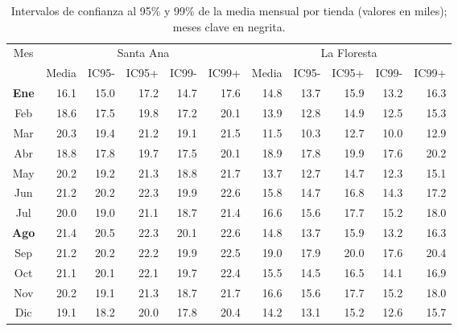 \documentclass[12pt,a4paper]{article}
\begin{document}
\begin{table}[H]
  \centering
  \small
  \begin{tabular}{c rrrrr | rrrrr}
    \toprule
    Mes & \multicolumn{5}{c}{Santa Ana} & \multicolumn{5}{c}{La Floresta}\\
         & Media & IC95- & IC95+ & IC99- & IC99+ & Media & IC95- & IC95+ & IC99- & IC99+\\
    \midrule
    \textbf{Ene} & 16.1 & 15.0 & 17.2 & 14.7 & 17.6 & 14.8 & 13.7 & 15.9 & 13.2 & 16.3\\
    Feb & 18.6 & 17.5 & 19.8 & 17.2 & 20.1 & 13.9 & 12.8 & 14.9 & 12.5 & 15.3\\
    Mar & 20.3 & 19.4 & 21.2 & 19.1 & 21.5 & 11.5 & 10.3 & 12.7 & 10.0 & 12.9\\
    Abr & 18.8 & 17.8 & 19.7 & 17.5 & 20.1 & 18.9 & 17.8 & 19.9 & 17.6 & 20.2\\
    May & 20.2 & 19.2 & 21.3 & 18.8 & 21.7 & 13.7 & 12.7 & 14.7 & 12.3 & 15.1\\
    Jun & 21.2 & 20.2 & 22.3 & 19.9 & 22.6 & 15.8 & 14.7 & 16.8 & 14.3 & 17.2\\
    Jul & 20.0 & 19.0 & 21.1 & 18.7 & 21.4 & 16.6 & 15.6 & 17.7 & 15.2 & 18.0\\
    \textbf{Ago} & 21.4 & 20.5 & 22.3 & 20.1 & 22.6 & 14.8 & 13.7 & 15.9 & 13.2 & 16.3\\
    Sep & 21.2 & 20.2 & 22.2 & 19.9 & 22.5 & 19.0 & 17.9 & 20.0 & 17.6 & 20.4\\
    Oct & 21.1 & 20.1 & 22.1 & 19.7 & 22.4 & 15.5 & 14.5 & 16.5 & 14.1 & 16.9\\
    Nov & 20.2 & 19.1 & 21.3 & 18.7 & 21.7 & 16.6 & 15.6 & 17.7 & 15.2 & 18.0\\
    Dic & 19.1 & 18.2 & 20.0 & 17.8 & 20.4 & 14.2 & 13.1 & 15.2 & 12.6 & 15.7\\
    \bottomrule
  \end{tabular}
  \caption{Intervalos de confianza al 95\% y 99\% de la media mensual por tienda (valores en miles); meses clave en negrita.}
  \label{tab:ic_meses}
\end{table}
\end{document}
